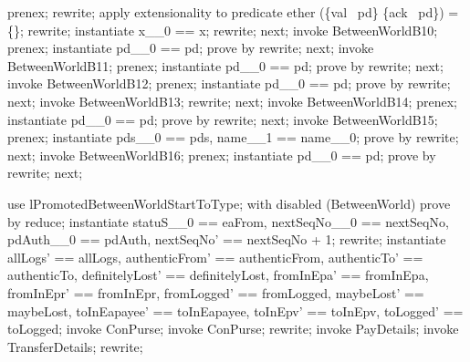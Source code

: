 \begin{LPScript}
\begin{zproof}[lPromotedBetweenWorldStartToType]
        prenex;
        rewrite;
        apply extensionality to predicate
            ether \cap (\{val~ pd\} \cup \{ack~ pd\}) = \{\};
        rewrite;
        instantiate x\_\_0 == x;
        rewrite;
    next;
        invoke BetweenWorldB10;
        prenex;
        instantiate pd\_\_0 == pd;
        prove by rewrite;
    next;
        invoke BetweenWorldB11;
        prenex;
        instantiate pd\_\_0 == pd;
        prove by rewrite;
    next;
        invoke BetweenWorldB12;
        prenex;
        instantiate pd\_\_0 == pd;
        prove by rewrite;
    next;
        invoke BetweenWorldB13;
        rewrite;
    next;
        invoke BetweenWorldB14;
        prenex;
        instantiate pd\_\_0 == pd;
        prove by rewrite;
    next;
        invoke BetweenWorldB15;
        prenex;
        instantiate pds\_\_0 == pds, name\_\_1 == name\_\_0;
        prove by rewrite;
    next;
        invoke BetweenWorldB16;
        prenex;
        instantiate pd\_\_0 == pd;
        prove by rewrite;
    next;
\end{zproof}\end{LPScript}

\begin{LPScript}\begin{zproof}[tBetwStartToEafromOkayPRE]
    use lPromotedBetweenWorldStartToType;
    with disabled (BetweenWorld) prove by reduce;
    instantiate statuS\_\_0 == eaFrom, nextSeqNo\_\_0 == nextSeqNo,
        pdAuth\_\_0 == pdAuth, nextSeqNo' == nextSeqNo + 1;
    rewrite;
    instantiate allLogs' == allLogs, authenticFrom' == authenticFrom,
        authenticTo' == authenticTo, definitelyLost' == definitelyLost,
        fromInEpa' == fromInEpa, fromInEpr' == fromInEpr,
        fromLogged' == fromLogged, maybeLost' == maybeLost,
        toInEapayee' == toInEapayee, toInEpv' == toInEpv,
        toLogged' == toLogged;
    invoke \Delta ConPurse;
    invoke ConPurse;
    rewrite;
    invoke PayDetails;
    invoke TransferDetails;
    rewrite;
\end{zproof}\end{LPScript}

